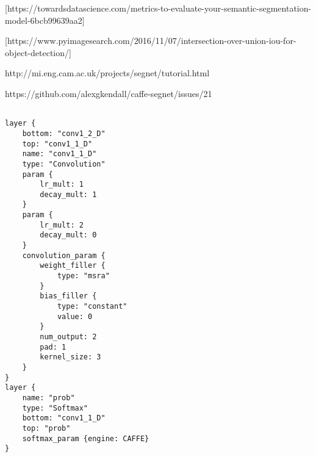 [https://towardsdatascience.com/metrics-to-evaluate-your-semantic-segmentation-model-6bcb99639aa2]

[https://www.pyimagesearch.com/2016/11/07/intersection-over-union-iou-for-object-detection/]

http://mi.eng.cam.ac.uk/projects/segnet/tutorial.html

https://github.com/alexgkendall/caffe-segnet/issues/21

\begin{lstlisting}

layer {
	bottom: "conv1_2_D"
	top: "conv1_1_D"
	name: "conv1_1_D"
	type: "Convolution"
	param {
		lr_mult: 1
		decay_mult: 1
	}
	param {
		lr_mult: 2
		decay_mult: 0
	}
	convolution_param {
		weight_filler {
			type: "msra"
		}
		bias_filler {
			type: "constant"
			value: 0
		}
		num_output: 2
		pad: 1
		kernel_size: 3
	}
}
layer {
	name: "prob"
	type: "Softmax"
	bottom: "conv1_1_D"
	top: "prob"
	softmax_param {engine: CAFFE}
}

\end{lstlisting}